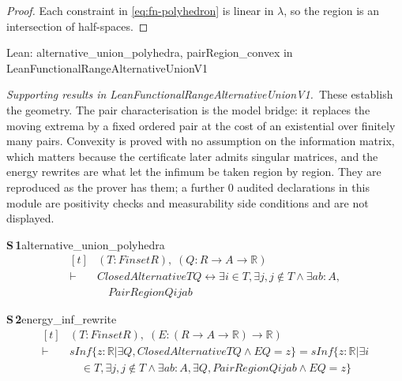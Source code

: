 \documentclass[conference]{IEEEtran}
\theoremstyle{definition}
\newcommand{\lean}[1]{\textsf{\footnotesize #1}}
\newcommand{\leanbox}[1]{%
  \par\vspace{2pt}\noindent
  {\footnotesize\textsf{Lean: #1}}\par\vspace{2pt}}
\begin{document}
\begin{proof}
Each constraint in \eqref{eq:fn-polyhedron} is linear in $\lambda$, so the region is an
intersection of half-spaces.
\end{proof}

\leanbox{\lean{alternative\_union\_polyhedra}, \lean{pairRegion\_convex} in
\lean{LeanFunctionalRangeAlternativeUnionV1}}

\noindent\emph{Supporting results in \lean{LeanFunctionalRangeAlternativeUnionV1}.}~These establish the geometry. The pair characterisation is the model bridge: it replaces the moving extrema by a fixed ordered pair at the cost of an existential over finitely many pairs. Convexity is proved with no assumption on the information matrix, which matters because the certificate later admits singular matrices, and the energy rewrites are what let the infimum be taken region by region. They are reproduced as the prover has them; a further $0$ audited declarations in this module are positivity checks and measurability side conditions and are not displayed.

\noindent\textbf{S\,1}\quad\lean{alternative\_union\_polyhedra}
{\footnotesize\[ \begin{aligned}[t]
&(\mathit{T} : \mathit{Finset} \mathit{R}),\; (\mathit{Q} : \mathit{R} \to \mathit{A} \to \mathbb{R} )\\
\vdash\;&\mathit{ClosedAlternative} \mathit{T} \mathit{Q} \leftrightarrow \exists \mathit{i} \in \mathit{T}, \exists \mathit{j}, \mathit{j} \notin \mathit{T} \wedge \exists \mathit{a} \mathit{b} : \mathit{A},\\
&\quad \mathit{PairRegion} \mathit{Q} \mathit{i} \mathit{j} \mathit{a} \mathit{b}
\end{aligned} \]}

\noindent\textbf{S\,2}\quad\lean{energy\_inf\_rewrite}
{\footnotesize\[ \begin{aligned}[t]
&(\mathit{T} : \mathit{Finset} \mathit{R}),\; (\mathit{E} : (\mathit{R} \to \mathit{A} \to \mathbb{R} ) \to \mathbb{R} )\\
\vdash\;&\mathit{sInf} \{ \mathit{z} : \mathbb{R} | \exists \mathit{Q}, \mathit{ClosedAlternative} \mathit{T} \mathit{Q} \wedge \mathit{E} \mathit{Q} = \mathit{z}\} = \mathit{sInf} \{ \mathit{z} : \mathbb{R} | \exists \mathit{i}\\
&\quad \in \mathit{T}, \exists \mathit{j}, \mathit{j} \notin \mathit{T} \wedge \exists \mathit{a} \mathit{b} : \mathit{A}, \exists \mathit{Q}, \mathit{PairRegion} \mathit{Q} \mathit{i} \mathit{j} \mathit{a} \mathit{b} \wedge \mathit{E} \mathit{Q} = \mathit{z}\}
\end{aligned} \]}
\end{document}
